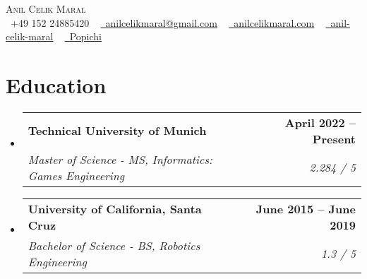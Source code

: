 \documentclass[letterpaper,11pt]{article}
\makeatletter
\newcommand{\resumeSubheading}[4]{
  \vspace{-2pt}\item
    \begin{tabular*}{1.0\textwidth}[t]{l@{\extracolsep{\fill}}r}
      \textbf{#1} & \textbf{\small #2} \\
      \textit{\small#3} & \textit{\small #4} \\
    \end{tabular*}\vspace{-7pt}
}
\newcommand{\resumeSubHeadingListStart}{\begin{itemize}[leftmargin=0.0in, label={}]}
\newcommand{\resumeSubHeadingListEnd}{\end{itemize}}
\makeatother
\begin{document}

\begin{center}
    {\Huge \scshape Anil Celik Maral} \\ \vspace{1pt}
    \vspace{1pt}
    \small \raisebox{-0.1\height}\faPhone\ +49 152 24885420 ~ \href{mailto:anilcelikmaral@gmail.com}{\raisebox{-0.2\height}\faEnvelope\  \underline{anilcelikmaral@gmail.com}} ~ 
    \href{https://anilcelikmaral.com/}{\raisebox{-0.2\height}\faGlobe\ \underline{anilcelikmaral.com}}  ~
    \href{https://www.linkedin.com/in/anil-celik-maral/}{\raisebox{-0.2\height}\faLinkedin\ \underline{anil-celik-maral}}  ~
    \href{https://github.com/Popichi}{\raisebox{-0.2\height}\faGithub\ \underline{Popichi}}
    \vspace{-10pt}  
    
\end{center}


\section{Education}
  \resumeSubHeadingListStart
    \resumeSubheading
      {Technical University of Munich}{April 2022 -- Present}
      {Master of Science - MS, Informatics: Games Engineering}{2.284 / 5}
      \resumeSubheading
      {University of California, Santa Cruz}{June 2015 -- June 2019}
      {Bachelor of Science - BS, Robotics Engineering}{1.3 / 5}

  \resumeSubHeadingListEnd

       

\vspace{-10pt}
\end{document}
